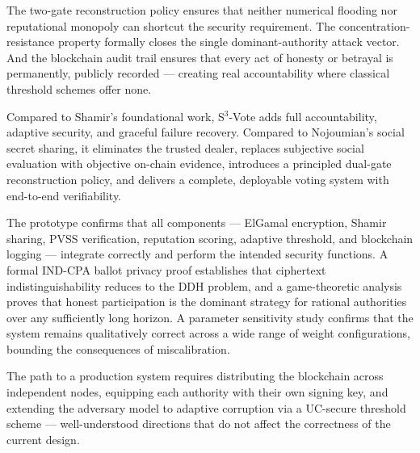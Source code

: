 \documentclass[12pt,a4paper]{article}
\theoremstyle{definition}
\theoremstyle{remark}
\begin{document}
The two-gate reconstruction policy ensures that neither numerical
flooding nor reputational monopoly can shortcut the security requirement.
The concentration-resistance property formally closes the single
dominant-authority attack vector. And the blockchain audit trail
ensures that every act of honesty or betrayal is permanently,
publicly recorded — creating real accountability where classical
threshold schemes offer none.

Compared to Shamir's foundational work, S$^3$-Vote adds
full accountability, adaptive security, and graceful failure recovery.
Compared to Nojoumian's social secret sharing, it eliminates the
trusted dealer, replaces subjective social evaluation with objective
on-chain evidence, introduces a principled dual-gate reconstruction
policy, and delivers a complete, deployable voting system with
end-to-end verifiability.

The prototype confirms that all components — ElGamal encryption,
Shamir sharing, PVSS verification, reputation scoring, adaptive threshold,
and blockchain logging — integrate correctly and perform the intended
security functions.
A formal IND-CPA ballot privacy proof establishes that ciphertext
indistinguishability reduces to the DDH problem, and a game-theoretic
analysis proves that honest participation is the dominant strategy for
rational authorities over any sufficiently long horizon.
A parameter sensitivity study confirms that the system remains
qualitatively correct across a wide range of weight configurations,
bounding the consequences of miscalibration.

The path to a production system requires distributing the blockchain
across independent nodes, equipping each authority with their own signing
key, and extending the adversary model to adaptive corruption via a
UC-secure threshold scheme — well-understood directions that do not
affect the correctness of the current design.
\end{document}
